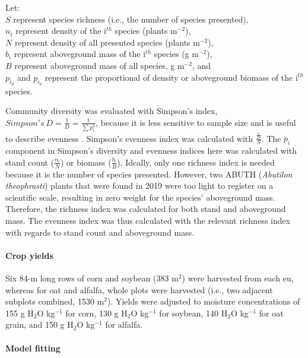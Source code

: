 \documentclass[
]{article}
\begin{document}
Let:\\
\(S\) represent species richness (i.e., the number of species presented),\\
\(n_i\) represent density of the i\(^{th}\) species (plants m\(^{-2}\)),\\
\(N\) represent density of all presented species (plants m\(^{-2}\)),\\
\(b_i\) represent aboveground mass of the i\(^{th}\) species (g m\(^{-2}\)),\\
\(B\) represent aboveground mass of all species, g m\(^{-2}\), and\\
\(p_{i_d}\) and \(p_{i_b}\) represent the proportional of density or aboveground biomass of the i\(^{th}\) species.

Community diversity was evaluated with Simpson's index, \(Simpson's\ D = \frac{1}{D} = \frac{1}{\sum p_i^2}\), because it is less sensitive to sample size and is useful to describe evenness \citep{nkoaWeedAbundanceDistribution2015}. Simpson's evenness index was calculated with \(\frac{\frac{1}{D}}{S}\). The \(p_i\) component in Simpson's diversity and evenness indices here was calculated with stand count (\(\frac{n_i}{N}\)) or biomass (\(\frac{b_i}{B}\)). Ideally, only one richness index is needed because it is the number of species presented. However, two ABUTH (\emph{Abutilon theophrasti}) plants that were found in 2019 were too light to register on a scientific scale, resulting in zero weight for the species' aboveground mass. Therefore, the richness index was calculated for both stand and aboveground mass. The evenness index was thus calculated with the relevant richness index with regards to stand count and aboveground mass.

\hypertarget{crop-yields}{%
\paragraph*{Crop yields}\label{crop-yields}}

Six 84-m long rows of corn and soybean (383 m\(^2\)) were harvested from each eu, whereas for oat and alfalfa, whole plots were harvested (i.e., two adjacent subplots combined, 1530 m\(^2\)). Yields were adjusted to moisture concentrations of 155 g H\(_2\)O kg\(^{-1}\) for corn, 130 g H\(_2\)O kg\(^{-1}\) for soybean, 140 H\(_2\)O kg\(^{-1}\) for oat grain, and 150 g H\(_2\)O kg\(^{-1}\) for alfalfa.

\hypertarget{model-fitting}{%
\paragraph*{Model fitting}\label{model-fitting}}
\end{document}
